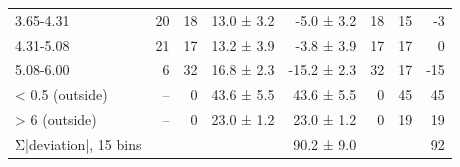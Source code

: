 \begin{table}[htbp]
\begin{tabular}{lrrrrrrr}
3.65-4.31 & 20 & 18 & 13.0 ± 3.2 & -5.0 ± 3.2 & 18 & 15 & -3 \\
4.31-5.08 & 21 & 17 & 13.2 ± 3.9 & -3.8 ± 3.9 & 17 & 17 & 0 \\
5.08-6.00 & 6 & 32 & 16.8 ± 2.3 & -15.2 ± 2.3 & 32 & 17 & -15 \\
< 0.5 (outside) & -- & 0 & 43.6 ± 5.5 & 43.6 ± 5.5 & 0 & 45 & 45 \\
> 6 (outside) & -- & 0 & 23.0 ± 1.2 & 23.0 ± 1.2 & 0 & 19 & 19 \\
Σ|deviation|, 15 bins &  &  &  & 90.2 ± 9.0 &  &  & 92 \\
\bottomrule
\end{tabular}
\end{table}
